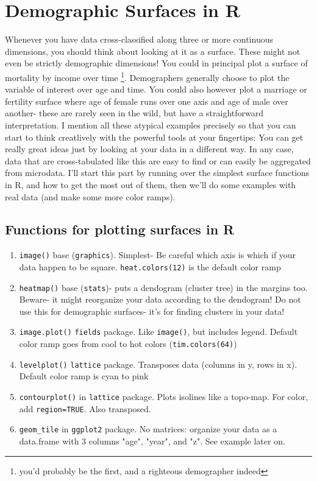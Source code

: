 \documentclass[a4paper]{article}
\begin{document}
\section{Demographic Surfaces in R}
Whenever you have data cross-classified along three or more continuous dimensions, you should think about looking at it as a surface. These might not even be strictly demographic dimensions! You could in principal plot a surface of mortality by income over time \footnote{you'd probably be the first, and a righteous demographer indeed}. Demographers generally choose to plot the variable of interest over age and time. You could also however plot a marriage or fertility surface where age of female runs over one axis and age of male over another- these are rarely seen in the wild, but have a straightforward interpretation. I mention all these atypical examples precisely so that you can start to think creatlively with the powerful tools at your fingertips: You can get really great ideas just by looking at your data in a different way. In any case, data that are cross-tabulated like this are easy to find or can easily be aggregated from microdata.  I'll start this part by running over the simplest surface functions in R, and how to get the most out of them, then we'll do some examples with real data (and make some more color ramps).

\subsection{Functions for plotting surfaces in R}

\begin{enumerate}
\item{\texttt{image()}} base (\texttt{graphics}). Simplest- Be careful which axis is which if your data happen to be square. \texttt{heat.colors(12)} is the default color ramp
\item{\texttt{heatmap()}} base (\texttt{stats})- puts a dendogram (cluster tree) in the margins too. Beware- it might reorganize your data according to the dendogram! Do not use this for demographic surfaces- it's for finding clusters in your data!
\item{\texttt{image.plot()}} \texttt{fields} package. Like \texttt{image()}, but includes legend. Default color ramp goes from cool to hot colors (\texttt{tim.colors(64)})
\item{\texttt{levelplot()}} \texttt{lattice} package. Transposes data (columns in y, rows in x). Default color ramp is cyan to pink
\item{\texttt{contourplot()}} in \texttt{lattice} package. Plots isolines like a topo-map. For color, add \texttt{region=TRUE}. Also transposed.
\item{\texttt{geom\_tile}} in \texttt{ggplot2} package. No matrices: organize your data as a data.frame with 3 columns "age", "year", and "z". See example later on.
\end{enumerate}
\end{document}
